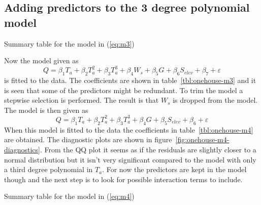 \subsection*{Adding predictors to the 3 degree polynomial model}
\begin{table}[ht]
    \centering
    
    \caption{Summary table for the model in (\ref{eq:m3})}\label{tbl:onehouse-m3}
\end{table}
Now the model given as
\begin{equation}\label{eq:m3}
    Q = \beta_1T_a + \beta_2T_a^2 + \beta_3T_a^3 + \beta_4W_s + \beta_5G + \beta_6S_{elev} + \beta_7 + \varepsilon
\end{equation}
is fitted to the data. The coefficients are shown in table~\ref{tbl:onehouse-m3} and it is seen that some of the predictors might be redundant. To trim the model a stepwise selection is performed. The result is that $W_s$ is dropped from the model. The model is then given as
\begin{equation}\label{eq:m4}
    Q = \beta_1T_a + \beta_2T_a^2 + \beta_3T_a^3 +  \beta_4G + \beta_5S_{elev} + \beta_6 + \varepsilon
\end{equation}
When this model is fitted to the data the coefficients in table~\ref{tbl:onehouse-m4} are obtained. The diagnostic plots are shown in figure~\ref{fig:onehouse-m4-diagnostics}. From the QQ plot it seems as if the residuals are slightly closer to a normal distribution but it isn't very significant compared to the model with only a third degree polynomial in $T_a$. For now the predictors are kept in the model though and the next step is to look for possible interaction terms to include.
\begin{table}[ht]
    \centering
    
    \caption{Summary table for the model in (\ref{eq:m4})}\label{tbl:onehouse-m4}
\end{table}
